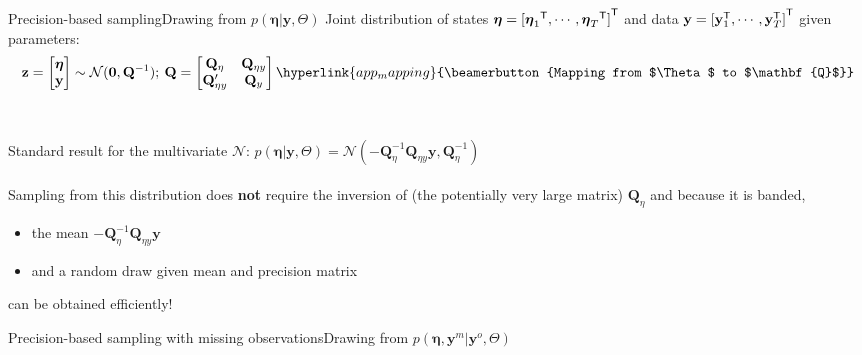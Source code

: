 \documentclass[xcolor=svgnames, 10pt, aspectratio=169]{beamer}
\newcommand\transpose[1]{{#1}^{\sf{T}}}
\begin{document}
\begin{frame}[fragile]{Precision-based sampling}{Drawing from $p(\boldsymbol{\eta} | \mathbf{y}, \Theta)$}
    \label{precsampl_draw_eta}
    Joint distribution of states $\boldsymbol{\eta} = \transpose{[\transpose{\boldsymbol{\eta}_1}, \cdots, \transpose{\boldsymbol{\eta}_T}]}$ and data $\mathbf{y} = \transpose{[\transpose{\mathbf{y}}_1, \cdots, \transpose{\mathbf{y}}_T]}$ given parameters: 
    $$
            \mathbf{z} =
            \begin{bmatrix}
                \boldsymbol{\eta} \\ 
                \mathbf{y}
            \end{bmatrix}     
            \sim        
            \mathcal{N}(\mathbf{0}, \mathbf{Q}^{-1})
            ; \: \mathbf{Q} = 
            \begin{bmatrix}
                \mathbf{Q}_{\eta} & \mathbf{Q}_{\eta y} \\
                \mathbf{Q}_{\eta y}' & \mathbf{Q}_{y}
            \end{bmatrix}   
            \hyperlink{app_mapping}{\beamerbutton{Mapping from $\Theta$ to $\mathbf{Q}$}} 
    $$ \\~\\    
    
    Standard result for the multivariate $\mathcal{N}$: $p(\boldsymbol{\eta} | \mathbf{y}, \Theta) = \mathcal{N}(-\mathbf{Q}_{\eta}^{-1} \mathbf{Q}_{\eta y} \mathbf{y}, \mathbf{Q}_{\eta}^{-1})$\\~\\

    Sampling from this distribution does \textbf{not} require the inversion of (the potentially very large matrix) $\mathbf{Q}_{\eta}$ and because it is banded, 
    \vspace{0.2cm}
    \begin{itemize}
        \item the mean $-\mathbf{Q}_{\eta}^{-1} \mathbf{Q}_{\eta y} \mathbf{y}$ 
        \item and a random draw given mean and precision matrix 
    \end{itemize}
    \vspace{0.2cm}
    can be obtained efficiently! \hyperlink{app_rueheld_algs}{}
    
\end{frame}

\begin{frame}{Precision-based sampling with missing observations}{Drawing from $p(\boldsymbol{\eta}, \mathbf{y}^m | \mathbf{y}^o, \Theta)$}
    
\end{frame}
\end{document}
